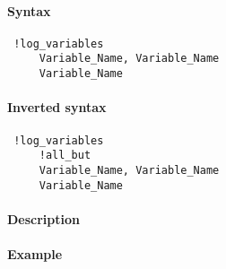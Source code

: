 


	\paragraph{Syntax}
 
 \begin{verbatim}
 !log_variables
     Variable_Name, Variable_Name
     Variable_Name
 \end{verbatim}
 
 \paragraph{Inverted syntax}
 
 \begin{verbatim}
 !log_variables
     !all_but
     Variable_Name, Variable_Name
     Variable_Name
 \end{verbatim}
 
 \paragraph{Description}
 
 \paragraph{Example}


